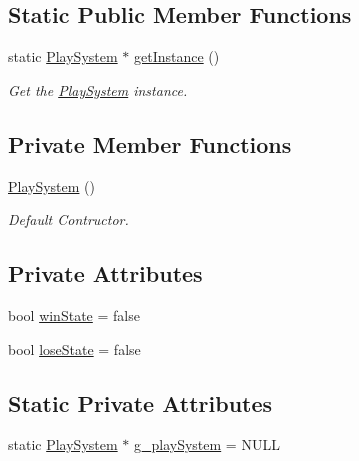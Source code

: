 \subsection*{Static Public Member Functions}
\begin{DoxyCompactItemize}
\item 
\mbox{\label{class_play_system_afb53ec58d3bda753432457625f0fdac9}} 
static \mbox{\hyperlink{class_play_system}{Play\+System}} $\ast$ \mbox{\hyperlink{class_play_system_afb53ec58d3bda753432457625f0fdac9}{get\+Instance}} ()
\begin{DoxyCompactList}\small\item\em Get the \mbox{\hyperlink{class_play_system}{Play\+System}} instance. \end{DoxyCompactList}\end{DoxyCompactItemize}
\subsection*{Private Member Functions}
\begin{DoxyCompactItemize}
\item 
\mbox{\label{class_play_system_a38710825647f33127437d06b0fcc4186}} 
\mbox{\hyperlink{class_play_system_a38710825647f33127437d06b0fcc4186}{Play\+System}} ()
\begin{DoxyCompactList}\small\item\em Default Contructor. \end{DoxyCompactList}\end{DoxyCompactItemize}
\subsection*{Private Attributes}
\begin{DoxyCompactItemize}
\item 
bool \mbox{\hyperlink{class_play_system_a259c6f581bfcace63445ffac48d8675f}{win\+State}} = false
\item 
bool \mbox{\hyperlink{class_play_system_a76a5ce42d2b9112171f587b04f992d59}{lose\+State}} = false
\end{DoxyCompactItemize}
\subsection*{Static Private Attributes}
\begin{DoxyCompactItemize}
\item 
static \mbox{\hyperlink{class_play_system}{Play\+System}} $\ast$ \mbox{\hyperlink{class_play_system_adfb9949639c2a4c96ee28b58fa1eb726}{g\+\_\+play\+System}} = N\+U\+LL
\end{DoxyCompactItemize}


